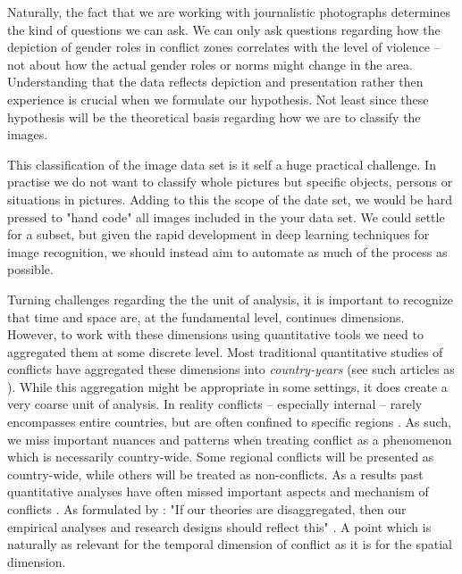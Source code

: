 \documentclass[a4paper]{article}
\begin{document}
Naturally, the fact that we are working with journalistic photographs determines the kind of questions we can ask. We can only ask questions regarding how the depiction of gender roles in conflict zones correlates with the level of violence -- not about how the actual gender roles or norms might change in the area. Understanding that the data reflects depiction and presentation rather then experience is crucial when we formulate our hypothesis. Not least since these hypothesis will be the theoretical basis regarding how we are to classify the images.\par 

This classification of the image data set is it self a huge practical challenge. In practise we do not want to classify whole pictures but specific objects, persons or situations in pictures. Adding to this the scope of the date set, we would be hard pressed to "hand code" all images included in the your data set. We could settle for a subset, but given the rapid development in deep learning techniques for image recognition, we should instead aim to automate as much of the process as possible.\par 

Turning challenges regarding the the unit of analysis, it is important to recognize that time and space are, at the fundamental level, continues dimensions. However, to work with these dimensions using quantitative tools we need to aggregated them at some discrete level. Most traditional quantitative studies of conflicts have aggregated these dimensions into \emph{country-years} (see such articles as \cite{Collier_Hoeffler_1998, Fearon_Laitin_2003, Collier_Hoeffler_2004, Fearon_2004, Ross_2004, Fearon_2005, Hegre_Sambanis_2006, Goldstone_2010}). While this aggregation might be appropriate in some settings, it does create a very coarse unit of analysis. In reality conflicts -- especially internal -- rarely encompasses entire countries, but are often confined to specific regions \cite[487]{Cederman_Gleditsch_2009}. As such, we miss important nuances and patterns when treating conflict as a phenomenon which is necessarily country-wide. Some regional conflicts will be presented as country-wide, while others will be treated as non-conflicts. As a results past quantitative analyses have often missed important aspects and mechanism of conflicts \cite{Cederman_Gleditsch_2009, Cederman_Gleditsch_Buhaug_2013}. As formulated by \cite{Cederman_Gleditsch_2009}: "If our theories are disaggregated, then our empirical analyses and research designs should reflect this" \citep[490]{Cederman_Gleditsch_2009}. A point which is naturally as relevant for the temporal dimension of conflict as it is for the spatial dimension.\par 
\end{document}
